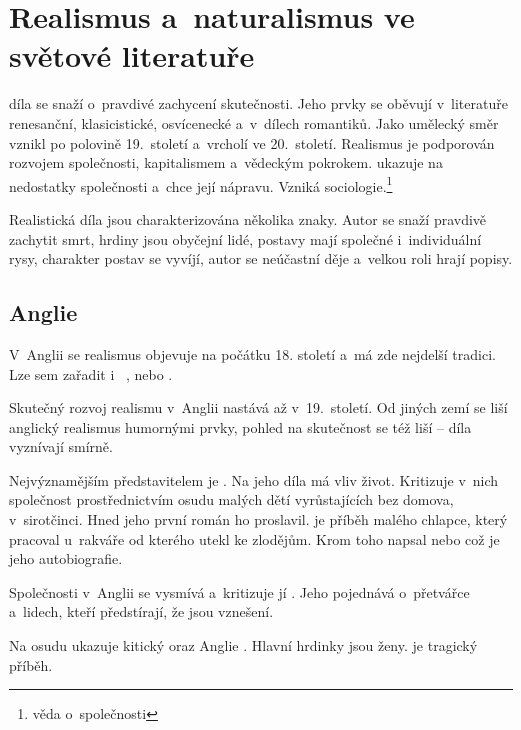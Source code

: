 \chapter[Světový realismus a~naturalismus]{Realismus a~naturalismus ve světové literatuře}
 díla se snaží o~pravdivé zachycení skutečnosti. Jeho prvky
se oběvují v~literatuře renesanční, klasicistické, osvícenecké a~v~dílech romantiků.
Jako umělecký směr vznikl po polovině 19.~století a~vrcholí ve 20.~století.
Realismus je podporován rozvojem společnosti, kapitalismem a~vědeckým pokrokem.
 ukazuje na nedostatky společnosti a~chce její nápravu.
Vzniká sociologie.\footnote{věda o~společnosti}

Realistická díla jsou charakterizována několika znaky. Autor se snaží
pravdivě zachytit smrt, hrdiny jsou obyčejní lidé, postavy mají společné
i~individuální rysy, charakter postav se vyvíjí, autor se neúčastní děje 
a~velkou roli hrají popisy.

\section{Anglie}
V~Anglii se realismus objevuje na počátku 18. století a~má zde nejdelší
tradici.
Lze sem zařadit i~ ,
nebo .

Skutečný rozvoj realismu v~Anglii nastává až v~19.~století. Od jiných
zemí se liší anglický realismus humornými prvky, pohled na skutečnost se
též liší -- díla vyznívají smírně.

Nejvýznamějším představitelem je . Na jeho díla
má vliv život. Kritizuje v~nich společnost prostřednictvím osudu malých
dětí vyrůstajících bez domova, v~sirotčinci. Hned jeho první román
 ho proslavil.  je
příběh malého chlapce, který pracoval u~rakváře od kterého utekl ke
zlodějům. Krom toho napsal  nebo 
 což je jeho autobiografie.

Společnosti v~Anglii se vysmívá a~kritizuje jí .
Jeho  pojednává o~přetvářce a~lidech,
kteří předstírají, že jsou vznešení.

Na osudu ukazuje kitický oraz Anglie . Hlavní
hrdinky jsou ženy.  je tragický příběh.

